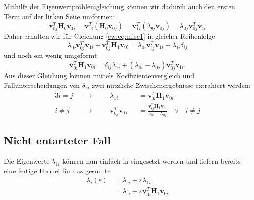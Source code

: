 Mithilfe der Eigenwertproblemgleichung können wir dadurch auch den ersten Term auf der linken Seite umformen:
\begin{equation}
    \bm v_{0j}^T \bm H_0 \bm v_{1i}
    =
    \bm v_{1i}^T \left(\bm H_0  \bm v_{0j} \right)
    =
    \bm v_{1i}^T \left(\lambda_{0j}  \bm v_{0j} \right)
    =
    \lambda_{0j} \bm v_{0j}^T \bm v_{1i}
\end{equation}
Daher erhalten wir für Gleichung \eqref{ew:eq:misc1} in gleicher Reihenfolge
\begin{equation}
    \lambda_{0j} \bm v_{0j}^T \bm v_{1i} +
    \bm v_{0j}^T \bm H_1 \bm v_{0i}
    =
    \lambda_{0i} \bm v_{0j}^T \bm v_{1i} +
    \lambda_{1i} \delta_{ij}
\end{equation}
und noch ein wenig umgeformt
\begin{equation}
    \bm v_{0j}^T \bm H_1 \bm v_{0i}
    =
    \delta_{ij} \lambda_{1i} +
    ( \lambda_{0i} - \lambda_{0j} )
    \bm v_{0j}^T  \bm v_{1i} .
\end{equation} \label{ew:eq:f}
Aus dieser Gleichung können mittels Koeffizientenvergleich und Fallunterscheidungen von $\delta_{ij}$ zwei nützliche Zwischenergebnisse extrahiert werden:
\begin{alignat}{3}
    i = j \quad & \rightarrow  \quad && \lambda_{1i}&& = \bm v_{0i}^T \bm H_1 \bm v_{0i} \\
    i \neq j \quad & \rightarrow \quad && \bm v_{0j}^T \bm v_{1i}&& = \frac{\bm v_{0j}^T \bm H_1 \bm v_{0i}}{\lambda_{0i} - \lambda_{0j}} \quad \forall \quad  i \neq j  \label{ew:eq:f2}
\end{alignat}

\subsection{Nicht entarteter Fall}

Die Eigenwerte $\lambda_{1i}$ können nun einfach in  eingesetzt werden und liefern bereits eine fertige Formel für das gesuchte
\begin{align*}
    \lambda_i(\varepsilon)
    &=
    \lambda_{0i} + \varepsilon \lambda_{1i} \\
    &=
    \lambda_{0i} + \varepsilon \bm v_{0i}^T \bm H_1 \bm v_{0i}
\end{align*}

